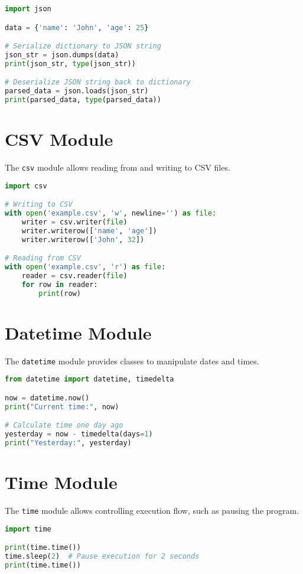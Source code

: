 \begin{lstlisting}[language=Python]
import json

data = {'name': 'John', 'age': 25}

# Serialize dictionary to JSON string
json_str = json.dumps(data)
print(json_str, type(json_str))

# Deserialize JSON string back to dictionary
parsed_data = json.loads(json_str)
print(parsed_data, type(parsed_data))
\end{lstlisting}

\section{CSV Module}

The \texttt{csv} module allows reading from and writing to CSV files.

\begin{lstlisting}[language=Python]
import csv

# Writing to CSV
with open('example.csv', 'w', newline='') as file:
    writer = csv.writer(file)
    writer.writerow(['name', 'age'])
    writer.writerow(['John', 32])

# Reading from CSV
with open('example.csv', 'r') as file:
    reader = csv.reader(file)
    for row in reader:
        print(row)
\end{lstlisting}

\section{Datetime Module}

The \texttt{datetime} module provides classes to manipulate dates and times.

\begin{lstlisting}[language=Python]
from datetime import datetime, timedelta

now = datetime.now()
print("Current time:", now)

# Calculate time one day ago
yesterday = now - timedelta(days=1)
print("Yesterday:", yesterday)
\end{lstlisting}

\section{Time Module}

The \texttt{time} module allows controlling execution flow, such as pausing the program.

\begin{lstlisting}[language=Python]
import time

print(time.time())
time.sleep(2)  # Pause execution for 2 seconds
print(time.time())
\end{lstlisting}

